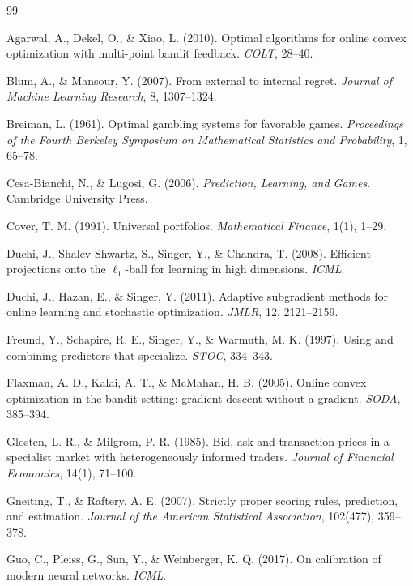 \documentclass[12pt,a4paper,oneside]{report}
\renewcommand{\_}{\oldunderscore\allowbreak}
\theoremstyle{definition}
\theoremstyle{plain}
\theoremstyle{remark}
\begin{document}
\begin{thebibliography}{99}

 Agarwal, A., Dekel, O., \& Xiao, L. (2010). Optimal algorithms for
online convex optimization with multi-point bandit feedback. \emph{COLT}, 28--40.

 Blum, A., \& Mansour, Y. (2007). From external to internal regret.
\emph{Journal of Machine Learning Research}, 8, 1307--1324.

 Breiman, L. (1961). Optimal gambling systems for favorable games.
\emph{Proceedings of the Fourth Berkeley Symposium on Mathematical Statistics and
Probability}, 1, 65--78.

 Cesa-Bianchi, N., \& Lugosi, G. (2006).
\emph{Prediction, Learning, and Games}. Cambridge University Press.

 Cover, T. M. (1991). Universal portfolios.
\emph{Mathematical Finance}, 1(1), 1--29.

 Duchi, J., Shalev-Shwartz, S., Singer, Y., \& Chandra, T. (2008).
Efficient projections onto the $\ell_1$-ball for learning in high dimensions.
\emph{ICML}.

 Duchi, J., Hazan, E., \& Singer, Y. (2011). Adaptive subgradient methods
for online learning and stochastic optimization. \emph{JMLR}, 12, 2121--2159.

 Freund, Y., Schapire, R. E., Singer, Y., \& Warmuth, M. K. (1997).
Using and combining predictors that specialize. \emph{STOC}, 334--343.

 Flaxman, A. D., Kalai, A. T., \& McMahan, H. B. (2005). Online convex
optimization in the bandit setting: gradient descent without a gradient. \emph{SODA},
385--394.

 Glosten, L. R., \& Milgrom, P. R. (1985). Bid, ask and transaction
prices in a specialist market with heterogeneously informed traders.
\emph{Journal of Financial Economics}, 14(1), 71--100.

 Gneiting, T., \& Raftery, A. E. (2007). Strictly proper scoring rules,
prediction, and estimation. \emph{Journal of the American Statistical Association}, 102(477),
359--378.

 Guo, C., Pleiss, G., Sun, Y., \& Weinberger, K. Q. (2017). On calibration
of modern neural networks. \emph{ICML}.


\end{thebibliography}
\end{document}
